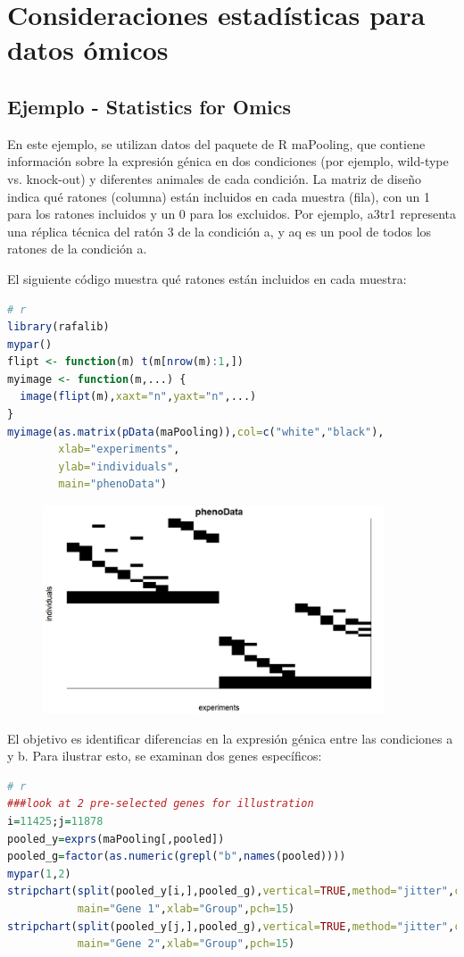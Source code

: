 \section{Consideraciones estadísticas para datos ómicos}
\subsection{Ejemplo - Statistics for Omics}
En este ejemplo, se utilizan datos del paquete de R maPooling, que contiene información sobre la expresión génica en dos condiciones (por ejemplo, wild-type vs. knock-out) y diferentes animales de cada condición. La matriz de diseño indica qué ratones (columna) están incluidos en cada muestra (fila), con un 1 para los ratones incluidos y un 0 para los excluidos. Por ejemplo, a3tr1 representa una réplica técnica del ratón 3 de la condición a, y aq es un pool de todos los ratones de la condición a.

El siguiente código muestra qué ratones están incluidos en cada muestra:
\begin{lstlisting}[language=R]
# r
library(rafalib)
mypar()
flipt <- function(m) t(m[nrow(m):1,])
myimage <- function(m,...) {
  image(flipt(m),xaxt="n",yaxt="n",...)
}
myimage(as.matrix(pData(maPooling)),col=c("white","black"),
        xlab="experiments",
        ylab="individuals",
        main="phenoData")
\end{lstlisting}

\begin{figure}[h]
\centering
\includegraphics[width = 0.9\textwidth]{figs/pools.jpg}
\end{figure}

El objetivo es identificar diferencias en la expresión génica entre las condiciones a y b. Para ilustrar esto, se examinan dos genes específicos:
\begin{lstlisting}[language=R]
# r
###look at 2 pre-selected genes for illustration
i=11425;j=11878
pooled_y=exprs(maPooling[,pooled])
pooled_g=factor(as.numeric(grepl("b",names(pooled))))
mypar(1,2)
stripchart(split(pooled_y[i,],pooled_g),vertical=TRUE,method="jitter",col=c(1,2),
           main="Gene 1",xlab="Group",pch=15)
stripchart(split(pooled_y[j,],pooled_g),vertical=TRUE,method="jitter",col=c(1,2),
           main="Gene 2",xlab="Group",pch=15)
\end{lstlisting}

